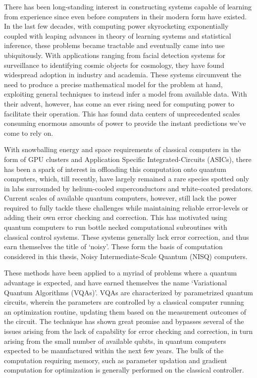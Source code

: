 
There has been long-standing interest in constructing systems capable of
learning from experience since even before computers in their modern form have
existed. In the last few decades, with computing power skyrocketing
exponentially coupled with leaping advances in theory of learning systems and
statistical inference, these problems became tractable and eventually came into
use ubiquitously. With applications ranging from facial detection systems for
surveillance to identifying cosmic objects for cosmology, they have found
widespread adoption in industry and academia. These systems circumvent the need
to produce a precise mathematical model for the problem at hand, exploiting
general techniques to instead infer a model from available data. With their
advent, however, has come an ever rising need for computing power to facilitate
their operation. This has found data centers of unprecedented scales consuming
enormous amounts of power to provide the instant predictions we've come to rely
on.

With snowballing energy and space requirements of classical computers in the
form of GPU clusters and Application Specific Integrated-Circuits (ASICs), there
has been a spark of interest in offloading this computation onto quantum
computers, which, till recently, have largely remained a rare species spotted
only in labs surrounded by helium-cooled superconductors and white-coated
predators. Current scales of available quantum computers, however, still lack
the power required to fully tackle these challenges while maintaining reliable
error-levels or adding their own error checking and correction. This has
motivated using quantum computers to run bottle necked computational subroutines
with classical control systems. These systems generally lack error correction,
and thus earn themselves the title of `noisy'. These form the basis of
computation considered in this thesis, Noisy Intermediate-Scale Quantum (NISQ)
computers.

These methods have been applied to a myriad of problems where a quantum
advantage is expected, and have earned themselves the name `Variational Quantum
Algorithms (VQAs)'. VQAs are characterized by parametrized quantum circuits,
wherein the parameters are controlled by a classical computer running an
optimization routine, updating them based on the measurement outcomes of the
circuit. The technique has shown great promise and bypasses several of the
issues arising from the lack of capability for error checking and correction, in
turn arising from the small number of available qubits, in quantum computers
expected to be manufactured within the next few years. The bulk of the
computation requiring memory, such as parameter updation and gradient
computation for optimization is generally performed on the classical controller.


